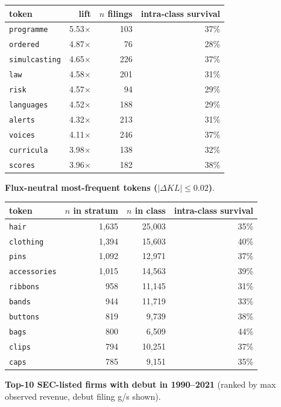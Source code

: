 \begin{tabular}{lrrr}
\toprule
token & lift & $n$ filings & intra-class survival \\
\midrule
\texttt{programme} & 5.53$\times$ & 103 & 37\% \\
\texttt{ordered} & 4.87$\times$ & 76 & 28\% \\
\texttt{simulcasting} & 4.65$\times$ & 226 & 37\% \\
\texttt{law} & 4.58$\times$ & 201 & 31\% \\
\texttt{risk} & 4.57$\times$ & 94 & 29\% \\
\texttt{languages} & 4.52$\times$ & 188 & 29\% \\
\texttt{alerts} & 4.32$\times$ & 213 & 31\% \\
\texttt{voices} & 4.11$\times$ & 246 & 37\% \\
\texttt{curricula} & 3.98$\times$ & 138 & 32\% \\
\texttt{scores} & 3.96$\times$ & 182 & 38\% \\
\bottomrule
\end{tabular}

\textbf{Flux-neutral most-frequent tokens ($|\Delta KL|\leq 0.02$)}.

\begin{tabular}{lrrr}
\toprule
token & $n$ in stratum & $n$ in class & intra-class survival \\
\midrule
\texttt{hair} & 1,635 & 25,003 & 35\% \\
\texttt{clothing} & 1,394 & 15,603 & 40\% \\
\texttt{pins} & 1,092 & 12,971 & 37\% \\
\texttt{accessories} & 1,015 & 14,563 & 39\% \\
\texttt{ribbons} & 958 & 11,145 & 31\% \\
\texttt{bands} & 944 & 11,719 & 33\% \\
\texttt{buttons} & 819 & 9,739 & 38\% \\
\texttt{bags} & 800 & 6,509 & 44\% \\
\texttt{clips} & 794 & 10,251 & 37\% \\
\texttt{caps} & 785 & 9,151 & 35\% \\
\bottomrule
\end{tabular}

\textbf{Top-10 SEC-listed firms with debut in 1990--2021} (ranked by max observed revenue, debut filing g/s shown).

